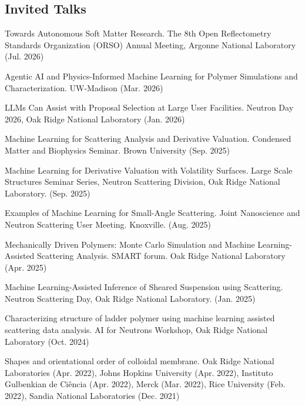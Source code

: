 \documentclass[11pt,letterpaper]{article}
\begin{document}
\subsection*{Invited Talks}
\begin{etaremune}
    \item Towards Autonomous Soft Matter Research. The 8th Open Reflectometry Standards Organization (ORSO) Annual Meeting, Argonne National Laboratory (Jul. 2026)
    \item Agentic AI and Physics-Informed Machine Learning for Polymer Simulations and Characterization. UW-Madison (Mar. 2026)
    \item LLMs Can Assist with Proposal Selection at Large User Facilities. Neutron Day 2026, Oak Ridge National Laboratory (Jan. 2026)
    \item Machine Learning for Scattering Analysis and Derivative Valuation. Condensed Matter and Biophysics Seminar. Brown University (Sep. 2025)
    \item Machine Learning for Derivative Valuation with Volatility Surfaces. Large Scale Structures Seminar Series, Neutron Scattering Division, Oak Ridge National Laboratory. (Sep. 2025)
    \item Examples of Machine Learning for Small-Angle Scattering. Joint Nanoscience and Neutron Scattering User Meeting. Knoxville. (Aug. 2025)
    \item Mechanically Driven Polymers: Monte Carlo Simulation and Machine Learning-Assisted Scattering Analysis. SMART forum. Oak Ridge National Laboratory (Apr. 2025)
    \item Machine Learning-Assisted Inference of Sheared Suspension using Scattering. Neutron Scattering Day, Oak Ridge National Laboratory. (Jan. 2025)
    \item Characterizing structure of ladder polymer using machine learning assisted scattering data analysis. AI for Neutrons Workshop, Oak Ridge National Laboratory (Oct. 2024)
    \item Shapes and orientational order of colloidal membrane. Oak Ridge National Laboratories (Apr. 2022), Johns Hopkins University (Apr. 2022), Instituto Gulbenkian de Ciência (Apr. 2022), Merck (Mar. 2022), Rice University (Feb. 2022), Sandia National Laboratories (Dec. 2021)
\end{etaremune}
\end{document}
